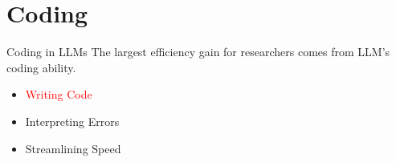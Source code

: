 \documentclass[
	11pt, %
	aspectratio=169, %
]{beamer}
\begin{document}
\section{Coding}
\begin{frame}{Coding in LLMs}
    The largest efficiency gain for researchers comes from LLM's coding ability. 
    \begin{itemize}
        \setlength{\itemsep}{20pt}
        \item \textcolor{red}{Writing Code}
        \item Interpreting Errors
        \item Streamlining Speed
    \end{itemize}
\end{frame}
\end{document}
